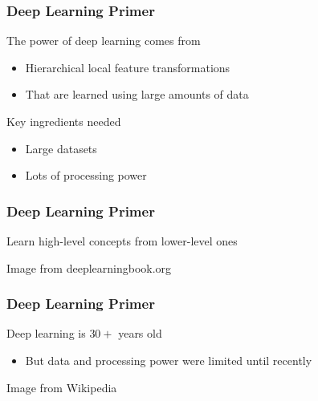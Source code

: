 \documentclass[xetex,professionalfont]{beamer}
\begin{document}
\begin{frame}
\frametitle{Deep Learning Primer}

The power of deep learning comes from
\begin{itemize}
    \item Hierarchical local feature transformations %
    \item That are learned using large amounts of data %
\end{itemize}

\bigskip

Key ingredients needed
\begin{itemize}
    \item Large datasets
    \item Lots of processing power
\end{itemize}

\end{frame}


\begin{frame}
\frametitle{Deep Learning Primer}

Learn high-level concepts from lower-level ones %

\medskip

\begin{center}
    {\centering Image from deeplearningbook.org}
\end{center}

\end{frame}


\begin{frame}
\frametitle{Deep Learning Primer}

Deep learning is $30+$ years old %
\begin{itemize}
    \item But data and processing power were limited until recently %
\end{itemize}

\medskip

\begin{center}
    {\centering Image from Wikipedia}
\end{center}

\end{frame}
\end{document}
